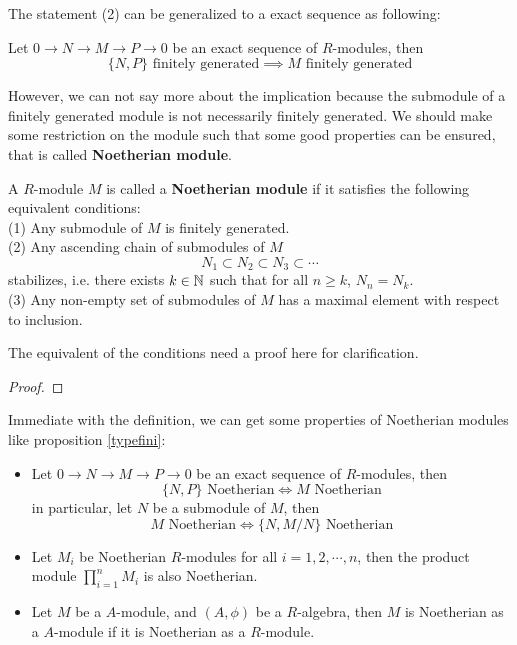 \documentclass[12pt,a4paper]{article}
\begin{document}
The statement (2) can be generalized to a exact sequence as following:
\begin{corollary}
Let \(0 \to N \to M \to P \to 0\) be an exact sequence of \(R\)-modules, then
\[\{N,P\} \text{ finitely generated} \implies M \text{ finitely generated}\]
\end{corollary}

However, we can not say more about the implication because the submodule of a finitely generated module is not necessarily finitely generated. We should make some restriction on the module such that some good properties can be ensured, that is called \textbf{Noetherian module}.
\begin{definitionplain}
    A \(R\)-module \(M\) is called a \textbf{Noetherian module} if it satisfies the following equivalent conditions:\\
    (1) Any submodule of \(M\) is finitely generated.\\
    (2) Any ascending chain of submodules of \(M\)
    \[N_1 \subset N_2 \subset N_3 \subset \cdots\]
    stabilizes, i.e. there exists \(k \in \mathbb{N}\) such that for all \(n \geq k\), \(N_n = N_k\).\\
    (3) Any non-empty set of submodules of \(M\) has a maximal element with respect to inclusion.

\end{definitionplain}

The equivalent of the conditions need a proof here for clarification.
\begin{proof}

\end{proof}

Immediate with the definition, we can get some properties of Noetherian modules like proposition \ref{typefini}:
\begin{itemize}
    \item Let \(0 \to N \to M \to P \to 0\) be an exact sequence of \(R\)-modules, then
     \[\{N,P\} \text{ Noetherian} \iff M \text{ Noetherian}\]
    in particular, let \(N\) be a submodule of \(M\), then
    \[M \text{ Noetherian} \iff \{N, M/N\} \text{ Noetherian}\]

    \item Let \(M_i\) be Noetherian \(R\)-modules for all \(i=1,2,\cdots, n\), then the product module \(\prod_{i=1}^n M_i\) is also Noetherian.

    \item Let \(M\) be a \(A\)-module, and \((A,\phi)\) be a \(R\)-algebra, then \(M\) is Noetherian as a \(A\)-module if it is Noetherian as a \(R\)-module.
\end{itemize}
\end{document}
